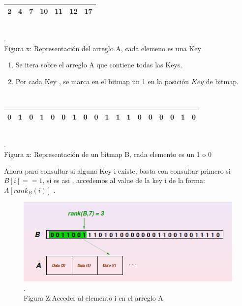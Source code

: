 \documentclass[11pt]{article}
\begin{document}
\begin{center}\begin{tabular}{|c|c|c|c|c|c|c|}
\hline
	2 & 4 & 7 & 10 & 11 & 12 & 17 \\
\hline
\end{tabular}

\\\scriptsize{\color{white}.\color{black}\\Figura x: Representación del arreglo A, cada elemeno es una Key}
\end{center}
\begin{center}
\begin{enumerate}
    \item Se itera sobre el arreglo A que contiene todas las Keys. 
    \item Por cada Key , se marca en el bitmap un 1 en la posición $Key$ de bitmap.
    
\end{enumerate}
\\
\begin{tabular}{|c|c|c|c|c|c|c|c|c|c|c|c|c|c|c|c|c|c|}
\hline
	 0 & 1 & 0 &1 &0 &0 &1 &0 & 0 & 1 & 1 & 1 & 0 & 0 & 0 & 0 & 1 &0 \\
\hline
\end{tabular}
\\\scriptsize{\color{white}.\color{black}\\Figura x: Representación de un bitmap B, cada elemento es un 1 o 0}
\end{center}

Ahora para consultar si alguna Key i existe, basta con consultar primero si $B[i]==1$, si es asi , accedemos al value de la key i de la forma: $A[rank_B(i)]$ .
\begin{center}\begin{figure}[htp]
\centering
\includegraphics[scale=0.5]{3.png}
\\\scriptsize{\color{white}.\color{black}\\Figura Z:Acceder al elemento i en el arreglo A  }
\label{etiqueta}
\end{figure}
\end{center}
\end{document}
